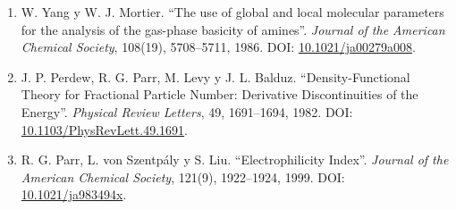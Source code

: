 \documentclass[12 pt, letter, oneside]{book}
\begin{document}
\begin{enumerate}
\item\label{anexo-ref-7} W. Yang y W. J. Mortier. ``The use of global and local molecular parameters for the analysis of the gas-phase basicity of amines''. \textit{Journal of the American Chemical Society}, 108(19), 5708--5711, 1986. DOI: \href{https://doi.org/10.1021/ja00279a008}{10.1021/ja00279a008}.

\item\label{anexo-ref-8} J. P. Perdew, R. G. Parr, M. Levy y J. L. Balduz. ``Density-Functional Theory for Fractional Particle Number: Derivative Discontinuities of the Energy''. \textit{Physical Review Letters}, 49, 1691--1694, 1982. DOI: \href{https://doi.org/10.1103/PhysRevLett.49.1691}{10.1103/PhysRevLett.49.1691}.

\item\label{anexo-ref-9} R. G. Parr, L. von Szentpály y S. Liu. ``Electrophilicity Index''. \textit{Journal of the American Chemical Society}, 121(9), 1922--1924, 1999. DOI: \href{https://doi.org/10.1021/ja983494x}{10.1021/ja983494x}.

\end{enumerate}
\endgroup


\fancyhead{}
\newpage
{}

\end{document}
